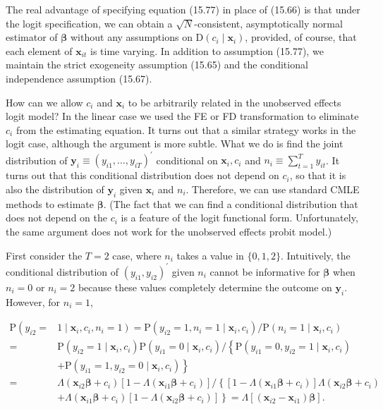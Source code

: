 \documentclass[10pt]{article}
\begin{document}
The real advantage of specifying equation (15.77) in place of (15.66) is that under the logit specification, we can obtain a $\sqrt{N}$-consistent, asymptotically normal estimator of $\boldsymbol{\beta}$ without any assumptions on $\mathrm{D}\left(c_{i} \mid \mathbf{x}_{i}\right)$, provided, of course, that each element of $\mathbf{x}_{i t}$ is time varying. In addition to assumption (15.77), we maintain the strict exogeneity assumption (15.65) and the conditional independence assumption (15.67).

How can we allow $c_{i}$ and $\mathbf{x}_{i}$ to be arbitrarily related in the unobserved effects logit model? In the linear case we used the FE or FD transformation to eliminate $c_{i}$ from the estimating equation. It turns out that a similar strategy works in the logit case, although the argument is more subtle. What we do is find the joint distribution of $\mathbf{y}_{i} \equiv\left(y_{i 1}, \ldots, y_{i T}\right)^{\prime}$ conditional on $\mathbf{x}_{i}, c_{i}$ and $n_{i} \equiv \sum_{t=1}^{T} y_{i t}$. It turns out that this conditional distribution does not depend on $c_{i}$, so that it is also the distribution of $\mathbf{y}_{i}$ given $\mathbf{x}_{i}$ and $n_{i}$. Therefore, we can use standard CMLE methods to estimate $\boldsymbol{\beta}$. (The fact that we can find a conditional distribution that does not depend on the $c_{i}$ is a feature of the logit functional form. Unfortunately, the same argument does not work for the unobserved effects probit model.)

First consider the $T=2$ case, where $n_{i}$ takes a value in $\{0,1,2\}$. Intuitively, the conditional distribution of $\left(y_{i 1}, y_{i 2}\right)^{\prime}$ given $n_{i}$ cannot be informative for $\boldsymbol{\beta}$ when $n_{i}=0$ or $n_{i}=2$ because these values completely determine the outcome on $\mathbf{y}_{i}$. However, for $n_{i}=1$,

$$
\begin{aligned}
\mathrm{P}\left(y_{i 2}=\right. & \left.1 \mid \mathbf{x}_{i}, c_{i}, n_{i}=1\right)=\mathrm{P}\left(y_{i 2}=1, n_{i}=1 \mid \mathbf{x}_{i}, c_{i}\right) / \mathrm{P}\left(n_{i}=1 \mid \mathbf{x}_{i}, c_{i}\right) \\
= & \mathrm{P}\left(y_{i 2}=1 \mid \mathbf{x}_{i}, c_{i}\right) \mathrm{P}\left(y_{i 1}=0 \mid \mathbf{x}_{i}, c_{i}\right) /\left\{\mathrm{P}\left(y_{i 1}=0, y_{i 2}=1 \mid \mathbf{x}_{i}, c_{i}\right)\right. \\
& \left.+\mathrm{P}\left(y_{i 1}=1, y_{i 2}=0 \mid \mathbf{x}_{i}, c_{i}\right)\right\} \\
= & \Lambda\left(\mathbf{x}_{i 2} \boldsymbol{\beta}+c_{i}\right)\left[1-\Lambda\left(\mathbf{x}_{i 1} \boldsymbol{\beta}+c_{i}\right)\right] /\left\{\left[1-\Lambda\left(\mathbf{x}_{i 1} \boldsymbol{\beta}+c_{i}\right)\right] \Lambda\left(\mathbf{x}_{i 2} \boldsymbol{\beta}+c_{i}\right)\right. \\
& \left.+\Lambda\left(\mathbf{x}_{i 1} \boldsymbol{\beta}+c_{i}\right)\left[1-\Lambda\left(\mathbf{x}_{i 2} \boldsymbol{\beta}+c_{i}\right)\right]\right\}=\Lambda\left[\left(\mathbf{x}_{i 2}-\mathbf{x}_{i 1}\right) \boldsymbol{\beta}\right] .
\end{aligned}
$$
\end{document}
